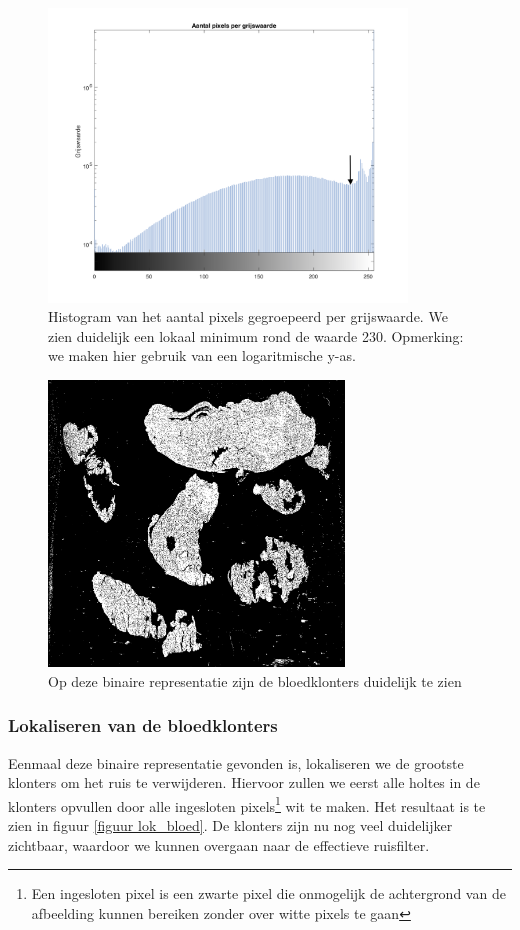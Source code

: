 \documentclass[a4paper,kulak]{kulakarticle}
\begin{document}
\begin{figure}[H]
	\centering
	\includegraphics[width=0.85\textwidth]{GetBestTreshold_vb_aangeduid.png}
	
	\caption{Histogram van het aantal pixels gegroepeerd per grijswaarde. We zien duidelijk een lokaal minimum rond de waarde 230. Opmerking: we maken hier gebruik van een logaritmische y-as.}
	\label{figuur graf1}
\end{figure}
\begin{figure}[H]
	\centering
	\includegraphics[width=0.7\textwidth]{grijswaarden_bin_vb}
	
	\caption{Op deze binaire representatie zijn de bloedklonters duidelijk te zien}
	\label{figuur foto_bin}
\end{figure}

\subsubsection{Lokaliseren van de bloedklonters}
Eenmaal deze binaire representatie gevonden is, lokaliseren we de grootste klonters om het ruis te verwijderen. Hiervoor zullen we eerst alle holtes in de klonters opvullen door alle ingesloten pixels\footnote{Een ingesloten pixel is een zwarte pixel die onmogelijk de achtergrond van de afbeelding kunnen bereiken zonder over witte pixels te gaan} wit te maken. Het resultaat is te zien in figuur \ref{figuur lok_bloed}. De klonters zijn nu nog veel duidelijker zichtbaar, waardoor we kunnen overgaan naar de effectieve ruisfilter.
\end{document}
